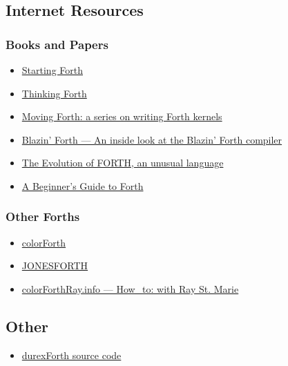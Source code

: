 \subsection{Internet Resources}

\subsubsection{Books and Papers}

\begin{itemize}
\item \href{http://www.forth.com/starting-forth/}{Starting Forth}
\item \href{http://thinking-forth.sourceforge.net/}{Thinking Forth}
\item \href{http://www.bradrodriguez.com/papers/}{Moving Forth: a series on writing Forth kernels}
\item \href{http://www.csbruce.com/~csbruce/cbm/transactor/v7/i5/p058.html}{Blazin' Forth --- An inside look at the Blazin' Forth compiler}
\item \href{http://www.drdobbs.com/architecture-and-design/the-evolution-of-forth-an-unusual-langua/228700557}{The Evolution of FORTH, an unusual language}
\item \href{http://galileo.phys.virginia.edu/classes/551.jvn.fall01/primer.htm}{A Beginner's Guide to Forth}
\end{itemize}

\subsubsection{Other Forths}

\begin{itemize}
\item \href{http://www.colorforth.com/cf.html}{colorForth}
\item \href{http://www.annexia.org/forth}{JONESFORTH}
\item \href{http://colorforthray.info/}{colorForthRay.info --- How\_to: with Ray St. Marie}
\end{itemize}

\subsection{Other}

\begin{itemize}
\item \href{https://github.com/jkotlinski/durexforth}{durexForth source code}
\end{itemize}
